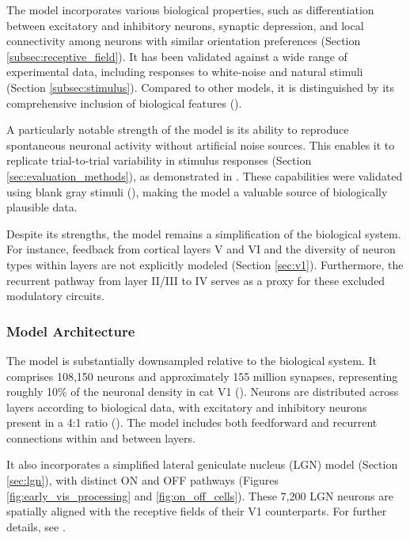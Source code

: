 The model incorporates various biological properties, such as differentiation between excitatory and inhibitory neurons, synaptic depression, and local connectivity among neurons with similar orientation preferences (Section \ref{subsec:receptive_field}). It has been validated against a wide range of experimental data, including responses to white-noise and natural stimuli (Section \ref{subsec:stimulus}). Compared to other models, it is distinguished by its comprehensive inclusion of biological features (\citet{antolik2024comprehensive}).

A particularly notable strength of the model is its ability to reproduce spontaneous neuronal activity without artificial noise sources. This enables it to replicate trial-to-trial variability in stimulus responses (Section \ref{sec:evaluation_methods}), as demonstrated in \citet{baudot_animation_2013}. These capabilities were validated using blank gray stimuli (\citet{PAPAIOANNOU1972558}), making the model a valuable source of biologically plausible data.

Despite its strengths, the model remains a simplification of the biological system. For instance, feedback from cortical layers V and VI and the diversity of neuron types within layers are not explicitly modeled (Section \ref{sec:v1}). Furthermore, the recurrent pathway from layer II/III to IV serves as a proxy for these excluded modulatory circuits.

\subsubsection{Model Architecture}
\label{subsubsec:spiking_cat_architecture}
The model is substantially downsampled relative to the biological system. It comprises 108,150 neurons and approximately 155 million synapses, representing roughly 10\% of the neuronal density in cat V1 (\citet{beaulie1989number}). Neurons are distributed across layers according to biological data, with excitatory and inhibitory neurons present in a 4:1 ratio (\citet{bealuliee1992quantitative, markram_interneurons_2004}). The model includes both feedforward and recurrent connections within and between layers.

It also incorporates a simplified lateral geniculate nucleus (LGN) model (Section \ref{sec:lgn}), with distinct ON and OFF pathways (Figures \ref{fig:early_vis_processing} and \ref{fig:on_off_cells}). These 7,200 LGN neurons are spatially aligned with the receptive fields of their V1 counterparts. For further details, see \citet{antolik2024comprehensive}.

